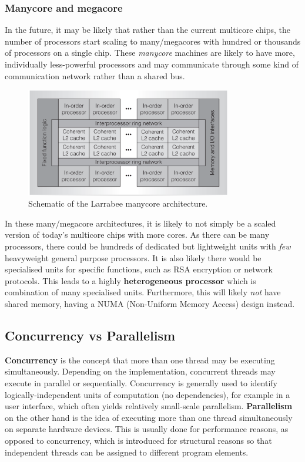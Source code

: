 \documentclass[CS4204-Notes.tex]{subfiles}
\begin{document}
\subsubsection{Manycore and megacore}
In the future, it may be likely that rather than the current multicore chips, the number of processors start scaling to many/megacores with hundred or thousands of processors on a single chip. These \textit{manycore} machines are likely to have more, individually less-powerful processors and may communicate through some kind of communication network rather than a shared bus.
\begin{figure}[H]
\centering
\includegraphics[width=0.8\textwidth, keepaspectratio]{imgs/manycore-architecture.png}
\caption{Schematic of the Larrabee manycore architecture.}
\end{figure}
\noindent
In these many/megacore architectures, it is likely to not simply be a scaled version of today's multicore chips with more cores. As there can be many processors, there could be hundreds of dedicated but lightweight units with \textit{few} heavyweight general purpose processors. It is also likely there would be specialised units for specific functions, such as RSA encryption or network protocols. This leads to a highly \textbf{heterogeneous processor} which is combination of many specialised units. Furthermore, this will likely \textit{not} have shared memory, having a NUMA (Non-Uniform Memory Access) design instead. 

\subsection{Concurrency vs Parallelism}
\textbf{Concurrency} is the concept that more than one thread may be executing simultaneously. Depending on the implementation, concurrent threads may execute in parallel or sequentially. Concurrency is generally used to identify logically-independent units of computation (no dependencies), for example in a user interface, which often yields relatively small-scale parallelism.
\n
\textbf{Parallelism} on the other hand is the idea of executing more than one thread simultaneously on separate hardware devices. This is usually done for performance reasons, as opposed to concurrency, which is introduced for structural reasons so that independent threads can be assigned to different program elements. 
\end{document}
